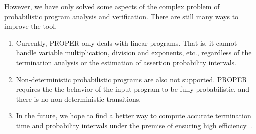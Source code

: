 \documentclass[sigconf,review, anonymous]{acmart}
\begin{document}
However, we have only solved some aspects of the complex problem of probabilistic program analysis and verification. There are still many ways to improve the tool.
\begin{enumerate}
	\item Currently, PROPER only deals with linear programs. That is, it cannot handle variable multiplication, division and exponents, etc., regardless of the termination analysis or the estimation of assertion probability intervals.
	\item Non-deterministic probabilistic programs  are also not supported. PROPER requires the the behavior of the input program to be fully probabilistic, and there is no non-deterministic transitions. 
	\item In the future, we hope to find a better way to compute accurate termination time and probability intervals under the premise of ensuring high efficiency~\cite{Hermanns2013Probabilistic}. 
\end{enumerate}




\end{document}
